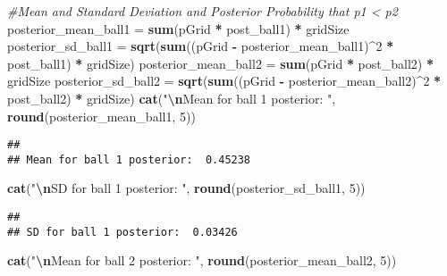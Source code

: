 \documentclass[
]{article}
\newenvironment{Shaded}{\begin{snugshade}}{\end{snugshade}}
\newcommand{\CommentTok}[1]{\textcolor[rgb]{0.56,0.35,0.01}{\textit{#1}}}
\newcommand{\DecValTok}[1]{\textcolor[rgb]{0.00,0.00,0.81}{#1}}
\newcommand{\FunctionTok}[1]{\textcolor[rgb]{0.13,0.29,0.53}{\textbf{#1}}}
\newcommand{\NormalTok}[1]{#1}
\newcommand{\OtherTok}[1]{\textcolor[rgb]{0.56,0.35,0.01}{#1}}
\newcommand{\SpecialCharTok}[1]{\textcolor[rgb]{0.81,0.36,0.00}{\textbf{#1}}}
\newcommand{\StringTok}[1]{\textcolor[rgb]{0.31,0.60,0.02}{#1}}
\begin{document}
\begin{Shaded}
\begin{Highlighting}[]
\CommentTok{\#Mean and Standard Deviation and Posterior Probability that p1 \textless{} p2}
\NormalTok{posterior\_mean\_ball1 }\OtherTok{=} \FunctionTok{sum}\NormalTok{(pGrid }\SpecialCharTok{*}\NormalTok{ post\_ball1) }\SpecialCharTok{*}\NormalTok{ gridSize}
\NormalTok{posterior\_sd\_ball1 }\OtherTok{=} 
  \FunctionTok{sqrt}\NormalTok{(}\FunctionTok{sum}\NormalTok{((pGrid }\SpecialCharTok{{-}}\NormalTok{ posterior\_mean\_ball1)}\SpecialCharTok{\^{}}\DecValTok{2} \SpecialCharTok{*}\NormalTok{ post\_ball1) }\SpecialCharTok{*}\NormalTok{ gridSize)}
\NormalTok{posterior\_mean\_ball2 }\OtherTok{=} \FunctionTok{sum}\NormalTok{(pGrid }\SpecialCharTok{*}\NormalTok{ post\_ball2) }\SpecialCharTok{*}\NormalTok{ gridSize}
\NormalTok{posterior\_sd\_ball2 }\OtherTok{=}  
  \FunctionTok{sqrt}\NormalTok{(}\FunctionTok{sum}\NormalTok{((pGrid }\SpecialCharTok{{-}}\NormalTok{ posterior\_mean\_ball2)}\SpecialCharTok{\^{}}\DecValTok{2} \SpecialCharTok{*}\NormalTok{ post\_ball2) }\SpecialCharTok{*}\NormalTok{ gridSize)}
\FunctionTok{cat}\NormalTok{(}\StringTok{"}\SpecialCharTok{\textbackslash{}n}\StringTok{Mean for ball 1 posterior: "}\NormalTok{, }\FunctionTok{round}\NormalTok{(posterior\_mean\_ball1, }\DecValTok{5}\NormalTok{))}
\end{Highlighting}
\end{Shaded}

\begin{verbatim}
## 
## Mean for ball 1 posterior:  0.45238
\end{verbatim}

\begin{Shaded}
\begin{Highlighting}[]
\FunctionTok{cat}\NormalTok{(}\StringTok{"}\SpecialCharTok{\textbackslash{}n}\StringTok{SD for ball 1 posterior: "}\NormalTok{, }\FunctionTok{round}\NormalTok{(posterior\_sd\_ball1, }\DecValTok{5}\NormalTok{))}
\end{Highlighting}
\end{Shaded}

\begin{verbatim}
## 
## SD for ball 1 posterior:  0.03426
\end{verbatim}

\begin{Shaded}
\begin{Highlighting}[]
\FunctionTok{cat}\NormalTok{(}\StringTok{"}\SpecialCharTok{\textbackslash{}n}\StringTok{Mean for ball 2 posterior: "}\NormalTok{, }\FunctionTok{round}\NormalTok{(posterior\_mean\_ball2, }\DecValTok{5}\NormalTok{))}
\end{Highlighting}
\end{Shaded}
\end{document}
